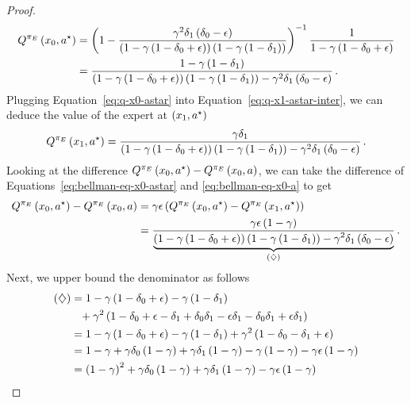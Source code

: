 \begin{proof}
\begin{align}
        Q^{\pi_E} \left( x_0, a^\star \right) &= \left( 1 - \frac{\gamma^2 \delta_1 \left( \delta_0 - \epsilon \right)}{\left( 1 - \gamma \left( 1 - \delta_0 + \epsilon \right) \right) \left( 1 - \gamma \left( 1 - \delta_1 \right) \right)} \right)^{-1} \frac{1}{1 - \gamma \left( 1 - \delta_0 + \epsilon \right)} \nonumber \\
        &= \frac{1 - \gamma \left( 1 - \delta_1 \right)}{\left( 1 - \gamma \left( 1 - \delta_0 + \epsilon \right) \right) \left( 1 - \gamma \left( 1 - \delta_1 \right) \right) - \gamma^2 \delta_1 \left( \delta_0 - \epsilon \right)}\,. \label{eq:q-x0-astar}
    \end{align}
    Plugging Equation~\eqref{eq:q-x0-astar} into Equation~\eqref{eq:q-x1-astar-inter}, we can deduce the value of the expert at $\left( x_1, a^\star \right)$
    \begin{equation*}
        Q^{\pi_E} \left( x_1, a^\star \right) = \frac{\gamma \delta_1}{\left( 1 - \gamma \left( 1 - \delta_0 + \epsilon \right) \right) \left( 1 - \gamma \left( 1 - \delta_1 \right) \right) - \gamma^2 \delta_1 \left( \delta_0 - \epsilon \right)}\,.
    \end{equation*}
    Looking at the difference $Q^{\pi_E} \left( x_0, a^\star \right) - Q^{\pi_E} \left( x_0, a \right)$, we can take the difference of Equations~\eqref{eq:bellman-eq-x0-astar} and \eqref{eq:bellman-eq-x0-a} to get
    \begin{align*}
        Q^{\pi_E} \left( x_0, a^\star \right) - Q^{\pi_E} \left( x_0, a \right) &= \gamma \epsilon \left( Q^{\pi_E} \left( x_0, a^\star \right) - Q^{\pi_E} \left( x_1, a^\star \right) \right) \\
        &= \frac{\gamma \epsilon \left( 1 - \gamma \right)}{\underbrace{\left( 1 - \gamma \left( 1 - \delta_0 + \epsilon \right) \right) \left( 1 - \gamma \left( 1 - \delta_1 \right) \right) - \gamma^2 \delta_1 \left( \delta_0 - \epsilon \right)}_{\left( \diamondsuit \right)}}\,.
    \end{align*}
    Next, we upper bound the denominator as follows
    \begin{align*}
        \spr{\diamondsuit} &= 1 - \gamma \spr{1 - \delta_0 + \epsilon} - \gamma \spr{1 - \delta_1} \\
        &\phantom{=}+ \gamma^2 \spr{1 - \delta_0 + \epsilon - \delta_1 + \delta_0 \delta_1 - \epsilon \delta_1 - \delta_0 \delta_1 + \epsilon \delta_1} \\
        &= 1 - \gamma \spr{1 - \delta_0 + \epsilon} - \gamma \spr{1 - \delta_1} + \gamma^2 \spr{1 - \delta_0 - \delta_1 + \epsilon} \\
        &= 1 - \gamma + \gamma \delta_0 \spr{1 - \gamma} + \gamma \delta_1 \spr{1 - \gamma} - \gamma \spr{1 - \gamma} - \gamma \epsilon \spr{1 - \gamma} \\
        &= \spr{1 - \gamma}^2 + \gamma \delta_0 \spr{1 - \gamma} + \gamma \delta_1 \spr{1 - \gamma} - \gamma \epsilon \spr{1 - \gamma} \\

\end{align*}
\end{proof}
